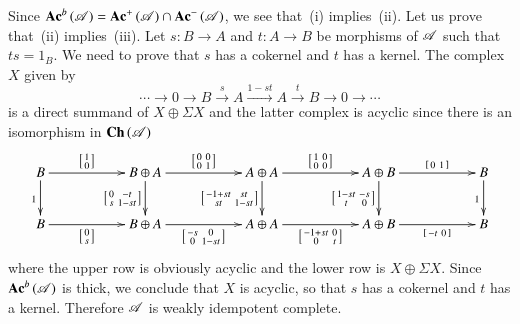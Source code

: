 \documentclass[1p]{elsarticle}
\makeatletter
\renewenvironment{proof}[1][\proofname]{\par
  \pushQED{\qed}%
  \normalfont \topsep6\p@\@plus6\p@\relax
  \trivlist
  \item[\hskip\labelsep
        \scshape
    #1\@addpunct{.}]\ignorespaces
}{%
  \popQED\endtrivlist\@endpefalse
}
\theoremstyle{mythm}
\theoremstyle{mydef}
\makeatother
\begin{document}
\begin{proof}
  Since $\operatorname{\mathbf{Ac}}^{b}{(\operatorname{\mathscr{A}})} = \operatorname{\mathbf{Ac}}^{+}{(\operatorname{\mathscr{A}})} \cap \operatorname{\mathbf{Ac}}^{-}{(\operatorname{\mathscr{A}})}$,
  we see that~(i) implies~(ii). Let us prove that~(ii)
  implies~(iii). 
  Let $s: B \to A$ and $t:A \to B$ be morphisms of $\operatorname{\mathscr{A}}$ such that
  $ts = 1_{B}$. We need to prove that $s$ has a
  cokernel and $t$ has a kernel. The complex $X$ given by
  \[
  \cdots \xrightarrow{} 0 \xrightarrow{} B \xrightarrow{s} A
  \xrightarrow{1-st} A \xrightarrow{t} B \xrightarrow{} 0
  \xrightarrow{} \cdots
  \]
  is a direct summand of
  $X \oplus \Sigma X$ and the latter complex is acyclic since there is
  an isomorphism in $\operatorname{\mathbf{Ch}}{(\operatorname{\mathscr{A}})}$ 
  \[
  \xymatrix{
    B \ar[d]_{1} \ar[rr]^-{\mat{1 \\ 0}} & &
    B \oplus A 
    \ar[d]_-{\mat{0 & -t \\ s  & 1-st}}
    \ar[rr]^-{\mat{0 & 0 \\ 0 & 1}} & &
    A \oplus A 
    \ar[d]_-{\mat{-1 + st & st \\ st & 1 - st}}
    \ar[rr]^-{\mat{1 & 0 \\ 0 & 0}} & &
    A \oplus B
    \ar[d]_-{\mat{1 - st & -s \\ t & 0}}
    \ar[rr]^-{\mat{0 & 1}} & & B \ar[d]_{1} \\
    B \ar[rr]_-{\mat{0 \\ s}} & &
    B \oplus A \ar[rr]_-{\mat{-s & 0 \\ 0 & 1 - st}} & &
    A \oplus A \ar[rr]_-{\mat{-1 + st & 0 \\ 0 & t}} & &
    A \oplus B \ar[rr]_-{\mat{-t & 0}} & &  B
  }
  \]
  where the upper row is obviously acyclic and the lower row is
  $X \oplus \Sigma X$. Since $\operatorname{\mathbf{Ac}}^{b}{(\operatorname{\mathscr{A}})}$ is thick, we conclude
  that $X$ is acyclic, so that $s$ has a cokernel and $t$ has a
  kernel. Therefore $\operatorname{\mathscr{A}}$ is weakly idempotent complete.


\end{proof}
\end{document}
